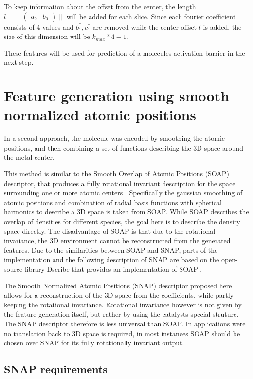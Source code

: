 To keep information about the offset from the center, the length $l = \| \begin{pmatrix} a_0 & b_0 \end{pmatrix} \| $ will be added for each slice.
Since each fourier coefficient consists of 4 values and $b_1^*, c_1^*$ are removed while the center offset $l$ is added, the size of this dimension will be $k_{max} * 4 - 1$.

These features will be used for prediction of a molecules activation barrier in the next step.


\newpage
\section{Feature generation using smooth normalized atomic positions}
\label{ch:SNAP}
In a second approach, the molecule was encoded by smoothing the atomic positions, 
and then combining a set of functions describing the 3D space around the metal center.

This method is similar to the Smooth Overlap of Atomic Positions (SOAP) descriptor, that produces a 
fully rotational invariant description for the space surrounding one or more atomic centers \cite{Bart_k_2013}.
Specifically the gaussian smoothing of atomic positions and combination of radial basis functions with
spherical harmonics to describe a 3D space is taken from SOAP.
While SOAP describes the overlap of densities for different species, the goal here is to describe the density space directly.
The disadvantage of SOAP is that due to the rotational invariance, the 3D environment cannot be reconstructed from the generated features.
Due to the similarities between SOAP and SNAP, parts of the implementation and the following description of SNAP are based 
on the open-source library Dscribe that provides an implementation of SOAP \cite{dscribe}.

The Smooth Normalized Atomic Positions (SNAP) descriptor proposed here allows for a reconstruction of the 3D space from the coefficients, 
while partly keeping the rotational invariance.
Rotational invariance however is not given by the feature generation itself, but rather by using the catalysts special struture.
The SNAP descriptor therefore is less universal than SOAP. 
In applications were no translation back to 3D space is required,
in most instances SOAP should be chosen over SNAP for its fully rotationally invariant output.

\subsection{SNAP requirements}

